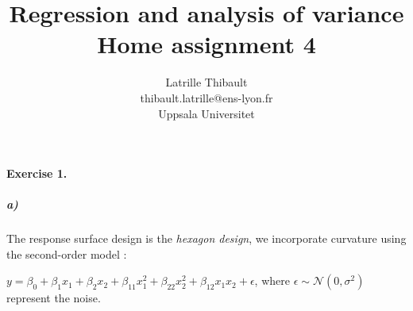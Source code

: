 \documentclass{article}
\author{Latrille Thibault\\
\small thibault.latrille@ens-lyon.fr\\[-0.8ex]
\small Uppsala Universitet\\}
\title{Regression and analysis of variance \\ Home assignment 4}
\begin{document}
\maketitle
\paragraph{Exercise 1.}
\subparagraph{a)}

The response surface design is the \textit{hexagon design}, we incorporate curvature using the second-order model :
\begin{center}
$y=\beta_0+ \beta_{1} x_{1} + \beta_{2} x_{2}+ \beta_{11} x_{1}^2+ \beta_{22} x_{2}^2 + \beta_{12} x_{1} x_{2} +\epsilon$, where $\epsilon \sim \mathcal{N}(0,\sigma^2)$ represent the noise.
\end{center}
\end{document}
